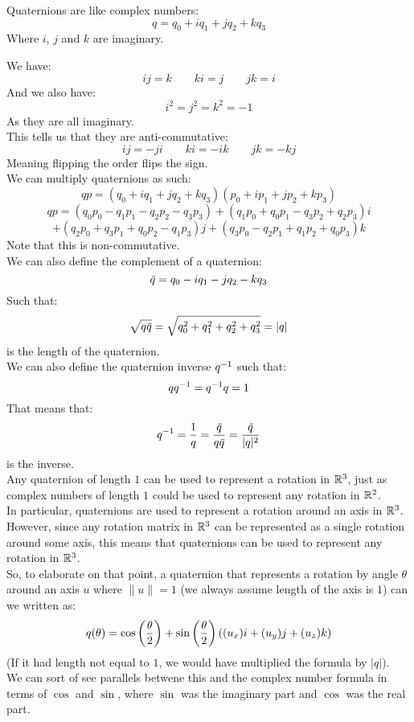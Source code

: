 \documentclass[12pt]{article}
\begin{document}
Quaternions are like complex numbers:
\[ q = q_0 + iq_1 + jq_2 + kq_3 \]
Where $i$, $j$ and $k$ are imaginary.

We have:
\[ ij = k \qquad ki = j \qquad jk = i \]
And we also have:
\[ i^2 = j^2 = k^2 = -1 \]
As they are all imaginary. \\

This tells us that they are anti-commutative:
\[ ij = -ji \qquad ki = -ik \qquad jk = -kj \]
Meaning flipping the order flips the sign. \\

We can multiply quaternions as such:
\[ qp = (q_0 + iq_1 + jq_2 + kq_3)
(p_0 + ip_1 + jp_2 + kp_3) \]
\[ qp = (q_0p_0 - q_1p_1 - q_2p_2 - q_3p_3) 
+ (q_1p_0 + q_0p_1 - q_3p_2 + q_2p_3)i \]
\[ + (q_2p_0 + q_3p_1 + q_0p_2 - q_1p_3)j 
+ (q_3p_0 - q_2p_1 + q_1p_2 + q_0p_3)k \]
Note that this is non-commutative. \\

We can also define the complement of a quaternion:
\[ \,\overline{\!{q}} = q_0 - iq_1 - jq_2 - kq_3 \]
Such that:
\[ \sqrt{q\,\overline{\!{q}}} 
= \sqrt{q_0^2 + q_1^2 + q_2^2 + q_3^2} = |q| \]
is the length of the quaternion. \\

We can also define the quaternion inverse $q^{-1}$
such that:
\[ qq^{-1} = q^{-1} q = 1 \]
That means that:
\[ q^{-1} = \dfrac{1}{q}
= \dfrac{\,\overline{\!{q}}}{q\,\overline{\!{q}}}
= \dfrac{\,\overline{\!{q}}}{|q|^2} \]
is the inverse. \\

Any quaternion of length $1$ can be used
to represent a rotation in $\mathbb{R}^3$,
just as complex numbers of length $1$
could be used to represent any 
rotation in $\mathbb{R}^2$. \\
In particular, quaternions are used
to represent a rotation around an axis in $\mathbb{R}^3$.
However, since any rotation matrix in $\mathbb{R}^3$
can be represented as a single rotation
around some axis,
this means that quaternions can be used
to represent any rotation in $\mathbb{R}^3$. \\

So, to elaborate on that point,
a quaternion that represents a rotation
by angle $\theta$
around an axis $u$ where $\|u\| = 1$
(we always assume length of the axis is $1$)
can we written as:
\[ q(\theta) = \cos \left( \dfrac{\theta}{2} \right)
+ \sin \left( \dfrac{\theta}{2} \right)
((u_x)i + (u_y)j + (u_z)k) \]
(If it had length not equal to $1$,
we would have multiplied the formula by $|q|$). \\
We can sort of see parallels
betwene this and the complex number
formula in terms of $\cos$ and $\sin$,
where $\sin$ was the imaginary part and
$\cos$ was the real part. \\
\end{document}
